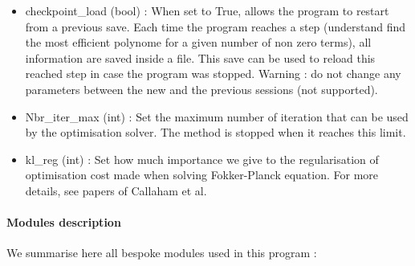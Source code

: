 \documentclass[A4paper]{article}
\begin{document}
\begin{itemize}
\item checkpoint\_load (bool) : When set to True, allows the program to restart from a previous save. Each time the program reaches a step (understand find the most efficient polynome for a given number of non zero terms), all information are saved inside a file. This save can be used to reload this reached step in case the program was stopped. Warning : do not change any parameters between the new and the previous sessions (not supported).

\item Nbr\_iter\_max (int) : Set the maximum number of iteration that can be used by the optimisation solver. The method is stopped when it reaches this limit.

\item kl\_reg (int) : Set how much importance we give to the regularisation of optimisation cost made when solving Fokker-Planck equation. For more details, see papers of Callaham et al.

\end{itemize}

\paragraph{Modules description}
We summarise here all bespoke modules used in this program :
\end{document}
